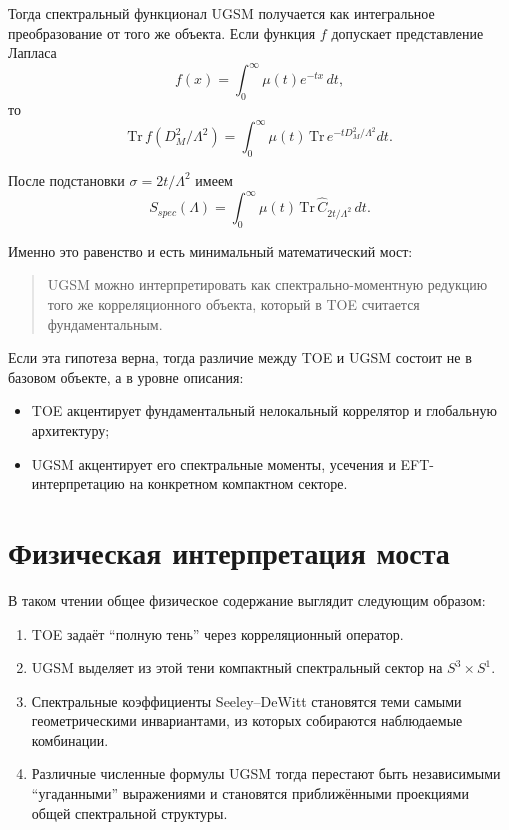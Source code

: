 \documentclass[12pt,a4paper]{article}
\begin{document}
Тогда спектральный функционал UGSM получается как интегральное преобразование от того же объекта. Если функция \(f\) допускает представление Лапласа
\begin{equation}
 f(x)=\int_0^{\infty} \mu(t)e^{-tx}\,dt,
\end{equation}
то
\begin{equation}
\mathrm{Tr}\, f(D_M^2/\Lambda^2)
= \int_0^{\infty} \mu(t)\, \mathrm{Tr}\, e^{-t D_M^2/\Lambda^2}dt.
\end{equation}

После подстановки \(\sigma = 2t/\Lambda^2\) имеем
\begin{equation}
S_{spec}(\Lambda)
=\int_0^{\infty} \mu(t)\, \mathrm{Tr}\, \hat C_{2t/\Lambda^2}\, dt.
\end{equation}

Именно это равенство и есть минимальный математический мост: 
\begin{quote}
UGSM можно интерпретировать как спектрально-моментную редукцию того же корреляционного объекта, который в TOE считается фундаментальным.
\end{quote}

Если эта гипотеза верна, тогда различие между TOE и UGSM состоит не в базовом объекте, а в уровне описания:
\begin{itemize}
    \item TOE акцентирует фундаментальный нелокальный коррелятор и глобальную архитектуру;
    \item UGSM акцентирует его спектральные моменты, усечения и EFT-интерпретацию на конкретном компактном секторе.
\end{itemize}

\section{Физическая интерпретация моста}

В таком чтении общее физическое содержание выглядит следующим образом:
\begin{enumerate}
    \item TOE задаёт ``полную тень'' через корреляционный оператор.
    \item UGSM выделяет из этой тени компактный спектральный сектор на \(S^3 \times S^1\).
    \item Спектральные коэффициенты Seeley--DeWitt становятся теми самыми геометрическими инвариантами, из которых собираются наблюдаемые комбинации.
    \item Различные численные формулы UGSM тогда перестают быть независимыми ``угаданными'' выражениями и становятся приближёнными проекциями общей спектральной структуры.
\end{enumerate}
\end{document}
